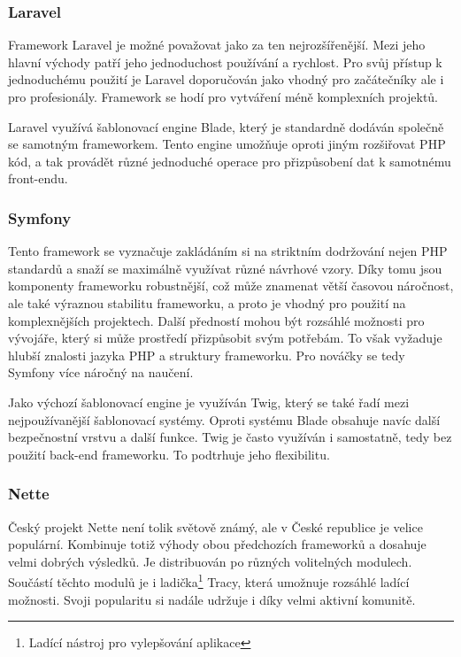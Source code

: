 \documentclass[czech,BP]{thesiskiv}
\begin{document}
	\subsubsection{Laravel}
	\par Framework Laravel je možné považovat jako za ten nejrozšířenější. Mezi jeho hlavní východy patří jeho jednoduchost používání a rychlost. Pro svůj přístup k jednoduchému použití je Laravel doporučován jako vhodný pro začátečníky ale i pro profesionály. Framework se hodí pro vytváření méně komplexních projektů.
	\par Laravel využívá šablonovací engine Blade, který je standardně dodáván společně se samotným frameworkem. Tento engine umožňuje oproti jiným rozšiřovat PHP kód, a tak provádět různé jednoduché operace pro přizpůsobení dat k samotnému front-endu.
	\subsubsection{Symfony}
	\par Tento framework se vyznačuje zakládáním si na striktním dodržování nejen PHP standardů a snaží se maximálně využívat různé návrhové vzory. Díky tomu jsou komponenty frameworku robustnější, což může znamenat větší časovou náročnost, ale také výraznou stabilitu frameworku, a proto je vhodný pro použití na komplexnějších projektech. Další předností mohou být rozsáhlé možnosti pro vývojáře, který si může prostředí přizpůsobit svým potřebám. To však vyžaduje hlubší znalosti jazyka PHP a struktury frameworku. Pro nováčky se tedy Symfony více náročný na naučení.
	\par Jako výchozí šablonovací engine je využíván Twig, který se také řadí mezi nejpoužívanější šablonovací systémy. Oproti systému Blade obsahuje navíc další bezpečnostní vrstvu a další funkce. Twig je často využíván i samostatně, tedy bez použití back-end frameworku. To podtrhuje jeho flexibilitu.
	\subsubsection{Nette}
	\par Český projekt Nette není tolik světově známý, ale v České republice je velice populární. Kombinuje totiž výhody obou předchozích frameworků a dosahuje velmi dobrých výsledků. Je distribuován po různých volitelných modulech. Součástí těchto modulů je i ladička\footnote{Ladící nástroj pro vylepšování aplikace} Tracy, která umožnuje rozsáhlé ladící možnosti. Svoji popularitu si nadále udržuje i díky velmi aktivní komunitě.
\end{document}
